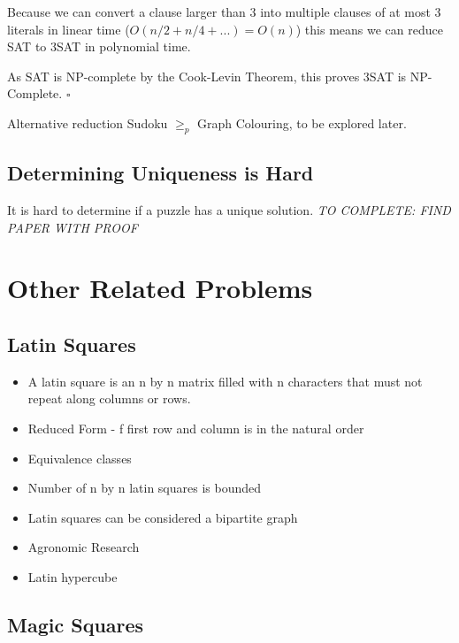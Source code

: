 \documentclass[a4paper,12pt]{article}
\begin{document}
Because we can convert a clause larger than 3 into multiple clauses of at most 3 literals in linear time ($O(n/2 + n/4 + ...) = O(n)$) this means we can reduce SAT to 3SAT in polynomial time. 

As SAT is NP-complete by the Cook-Levin Theorem, this proves 3SAT is NP-Complete. $\square$
		
Alternative reduction Sudoku $\geq_p$  Graph Colouring, to be explored later.

	\subsection{Determining Uniqueness is Hard}

It is hard to determine if a puzzle has a unique solution. 	 \textit{TO COMPLETE: FIND PAPER WITH PROOF}
		
\section{Other Related Problems}
	\subsection{Latin Squares}

		\begin{itemize}
		\item{A latin square is an n by n matrix filled with n characters that must not repeat along columns or rows.}
		\item{Reduced Form - f first row and column is in the natural order}
		\item{Equivalence classes}
		\item{Number of n by n latin squares is bounded}
		\item{Latin squares can be considered a bipartite graph}
		\item{Agronomic Research}
		\item{Latin hypercube}
		\end{itemize}

	\subsection{Magic Squares}
\end{document}
